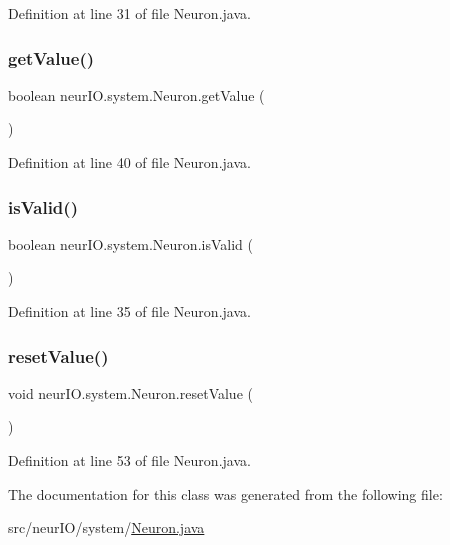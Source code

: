 Definition at line 31 of file Neuron.\+java.

\mbox{\label{classneur_i_o_1_1system_1_1_neuron_a7e2bfa3a562b6a26e3844d3285cbb669}} 
\subsubsection{\texorpdfstring{get\+Value()}{getValue()}}
{\footnotesize\ttfamily boolean neur\+I\+O.\+system.\+Neuron.\+get\+Value (\begin{DoxyParamCaption}{ }\end{DoxyParamCaption})}



Definition at line 40 of file Neuron.\+java.

\mbox{\label{classneur_i_o_1_1system_1_1_neuron_aa1ff6529c3a04fc5ecdaf41dd8a143cb}} 
\subsubsection{\texorpdfstring{is\+Valid()}{isValid()}}
{\footnotesize\ttfamily boolean neur\+I\+O.\+system.\+Neuron.\+is\+Valid (\begin{DoxyParamCaption}{ }\end{DoxyParamCaption})}



Definition at line 35 of file Neuron.\+java.

\mbox{\label{classneur_i_o_1_1system_1_1_neuron_a0adab143f0cbca556908f06d28cde838}} 
\subsubsection{\texorpdfstring{reset\+Value()}{resetValue()}}
{\footnotesize\ttfamily void neur\+I\+O.\+system.\+Neuron.\+reset\+Value (\begin{DoxyParamCaption}{ }\end{DoxyParamCaption})}



Definition at line 53 of file Neuron.\+java.



The documentation for this class was generated from the following file\+:\begin{DoxyCompactItemize}
\item 
src/neur\+I\+O/system/\hyperlink{_neuron_8java}{Neuron.\+java}\end{DoxyCompactItemize}
